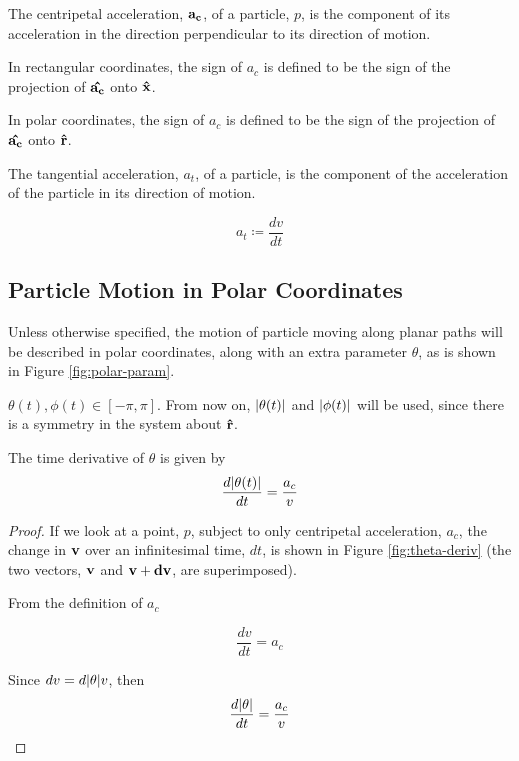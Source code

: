 \begin{definition}
  The centripetal acceleration, $\mathbf{a_c}$, of a particle, $p$, is the component of its acceleration in the direction perpendicular to its direction of motion.

  In rectangular coordinates, the sign of $a_c$ is defined to be the sign of the projection of $\mathbf{\hat{a_c}}$ onto $\mathbf{\hat{x}}$. 

  In polar coordinates, the sign of $a_c$ is defined to be the sign of the projection of $\mathbf{\hat{a_c}}$ onto $\mathbf{\hat{r}}$.
\end{definition}

\begin{definition}
  The tangential acceleration, $a_t$, of a particle, is the component of the acceleration of the particle in its direction of motion.

  \[a_t \coloneqq \frac{dv}{dt}\]
\end{definition}


\subsection{Particle Motion in Polar Coordinates}

Unless otherwise specified, the motion of particle moving along planar paths  will be described in polar coordinates, along with an extra parameter $\theta$, as is shown in Figure \ref{fig:polar-param}.


$\theta(t), \phi(t) \in [-\pi, \pi]$. From now on, $\abs{\theta(t)}$ and $\abs{\phi(t)}$ will be used, since there is a symmetry in the system about $\mathbf{\hat{r}}$.

\begin{lemma}
The time derivative of $\theta$ is given by
\[
\frac{d\abs{\theta(t)}}{dt} = \frac{a_c}{v}
\]
\end{lemma}

\begin{proof}

If we look at a point, $p$, subject to only centripetal acceleration, $a_c$, the change in $\mathbf{v}$ over an infinitesimal time, $dt$, is shown in Figure \ref{fig:theta-deriv} (the two vectors, $\mathbf{v}$ and $\mathbf{v}+\mathbf{dv}$, are superimposed). 


From the definition of $a_c$

\[
\frac{dv}{dt} = a_c
\]

Since $dv = d\abs{\theta} v$, then
\[
\frac{d\abs{\theta}}{dt} = \frac{a_c}{v}
\]
\end{proof}

